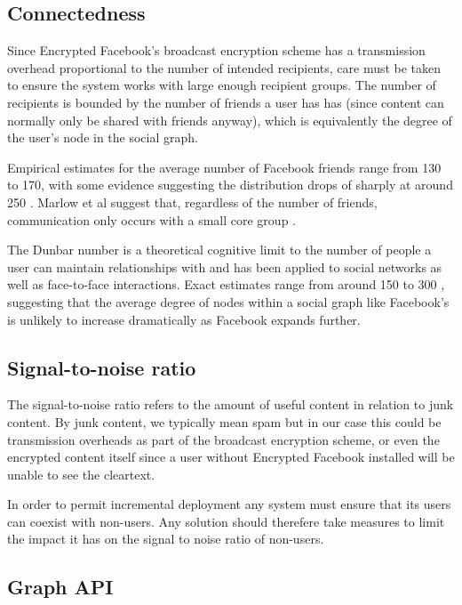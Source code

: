     
\FloatBarrier
\subsection{Connectedness}

Since Encrypted Facebook's broadcast encryption scheme has a transmission overhead proportional to the number of intended recipients, care must be taken to ensure the system works with large enough recipient groups. The number of recipients is bounded by the number of friends a user has has (since content can normally only be shared with friends anyway), which is equivalently the degree of the user's node in the social graph. 

Empirical estimates for the average number of Facebook friends range from 130 to 170, with some evidence suggesting the distribution drops of sharply at around 250 \cite{fb-factsheet} \cite{fb-connectedness}. Marlow et al suggest that, regardless of the number of friends, communication only occurs with a small core group \cite{burke2010social}.

The Dunbar number is a theoretical cognitive limit to the number of people a user can maintain relationships with and has been applied to social networks as well as face-to-face interactions. Exact estimates range from around 150 to 300 \cite{xxx} \cite{xxx}, suggesting that the average degree of nodes within a social graph like Facebook's is unlikely to increase dramatically as Facebook expands further.


\FloatBarrier
\subsection{Signal-to-noise ratio}

The signal-to-noise ratio refers to the amount of useful content in relation to junk content. By junk content, we typically mean spam but in our case this could be transmission overheads as part of the broadcast encryption scheme, or even the encrypted content itself since a user without Encrypted Facebook installed will be unable to see the cleartext.

In order to permit incremental deployment any system must ensure that its users can coexist with non-users. Any solution should therefere take measures to limit the impact it has on the signal to noise ratio of non-users.



\FloatBarrier
\subsection{Graph API}

